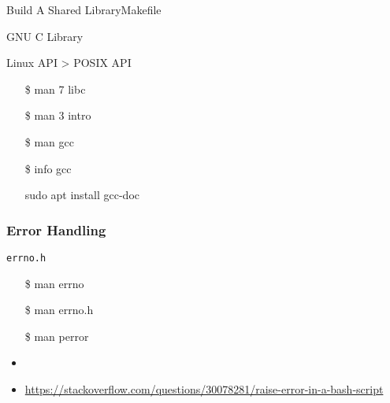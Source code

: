 \begin{frame}{Build A Shared Library}{Makefile}
  \begin{center}
  \end{center}
\end{frame}

\begin{frame}{GNU C Library}
  \begin{minipage}{.55\linewidth}
    Linux API > POSIX API
    \ttfamily
    \begin{itemize}
    \item[\$] man 7 libc
    \item[\$] man 3 intro
    \item[\$] man gcc
    \item[\$] info gcc
    \item[\debian] sudo apt install gcc-doc
    \end{itemize}
  \end{minipage}
  \begin{minipage}{.4\linewidth}
    \begin{center}
    \end{center}
  \end{minipage}
\end{frame}

\subsubsection{Error Handling}
\label{sec:error-handling}

\begin{frame}{\texttt{errno.h}}
  \begin{center}
  \end{center}\ttfamily
  \begin{itemize}
  \item[\$] man errno
  \item[\$] man errno.h
  \item[\$] man perror
  \end{itemize}
\end{frame}

\begin{itemize}
\item {}
\item \url{https://stackoverflow.com/questions/30078281/raise-error-in-a-bash-script}
\end{itemize}

